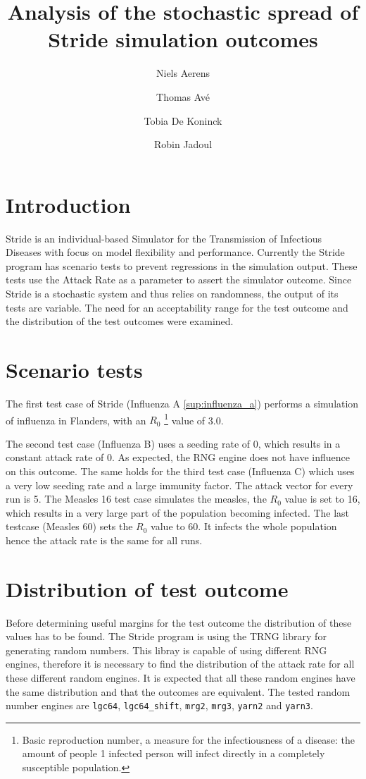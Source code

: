 \documentclass[natbib=true]{acmart}
\title{Analysis of the stochastic spread of Stride simulation outcomes}
\author{Niels Aerens}
\author{Thomas Avé}
\author{Tobia De Koninck}
\author{Robin Jadoul}
\begin{document}
\maketitle

\section{Introduction}
Stride \cite{KUYLEN20172438} is an individual-based Simulator for the Transmission of Infectious Diseases with focus on model flexibility and
performance. 
Currently the Stride program has scenario tests to prevent regressions in the
simulation output. 
These tests use the Attack Rate as a parameter to assert the simulator outcome. Since Stride is a stochastic
system and thus relies on randomness, the output of its tests are variable.
The need for an acceptability range for the test outcome and the distribution of the test outcomes were examined.

\pagebreak

\section{Scenario tests}

The first test case of Stride (Influenza A \ref{sup:influenza_a}) performs a simulation of influenza in Flanders, with an $R_0$ \footnote{Basic reproduction number, a measure for the infectiousness of a disease: the amount of people 1 infected person will infect directly in a completely susceptible population.} value of 3.0.

The second test case (Influenza B) uses a seeding rate of 0, which results in a constant attack rate of 0. As expected, the RNG engine does not have influence on this outcome. 
The same holds for the third test case (Influenza C) which uses a very low seeding rate and a large immunity factor.
The attack vector for every run is 5.
The Measles 16 test case simulates the measles, the \(R_0\) value is set to 16, which results in a very large part of the population becoming infected. 
The last testcase (Measles 60) sets the $R_0$ value to 60. It infects the
whole population hence the attack rate is the same for all runs.

\section{Distribution of test outcome}

Before determining useful margins for the test outcome the distribution of these values has to be found.
The Stride program is using the TRNG library \citep{bauke2015tina} for generating random numbers. This libray is capable of using different RNG engines, therefore it is necessary to find the distribution of the attack rate for all these different random engines.
It is expected that all these random engines have the same distribution and that the outcomes are equivalent. 
The tested random number engines are \texttt{lgc64}, \texttt{lgc64\_shift}, \texttt{mrg2}, \texttt{mrg3}, \texttt{yarn2} and \texttt{yarn3}.
\end{document}
